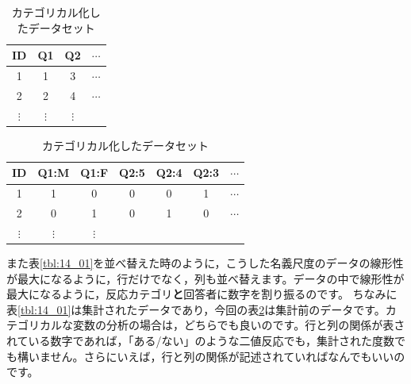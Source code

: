 \documentclass{ltjsbook}
\begin{document}
\begin{table}[ht]
	\begin{minipage}[t]{.30\textwidth}
		\begin{center}
			\caption{一般的なデータセット}
			\begin{tabular}{cccc}
				ID       & Q1       & Q2       & $\cdots$ \\\hline
				1        & 1        & 3        & $\cdots$ \\
				2        & 2        & 4        & $\cdots$ \\
				$\vdots$ & $\vdots$ & $\vdots$ &          \\\hline
			\end{tabular}
		\end{center}
		\label{tbl:14_04}
	\end{minipage}
	\hfill
	\begin{minipage}[t]{.60\textwidth}
		\begin{center}
			\caption{カテゴリカル化したデータセット}
			\begin{tabular}{ccccccc}
				ID       & Q1:M      & Q1:F     & Q2:5 & Q2:4 & Q2:3 & $\cdots$ \\\hline
				1        & 1         & 0        & 0    & 0    & 1    & $\cdots$ \\
				2        & 0         & 1        & 0    & 1    & 0    & $\cdots$ \\
				$\vdots$ & $\vdots $ & $\vdots$ &                               \\\hline
			\end{tabular}
		\end{center}
		\label{tbl:14_05}
	\end{minipage}
\end{table}

また表\ref{tbl:14_01}を並べ替えた時のように，こうした名義尺度のデータの線形性が最大になるように，行だけでなく，列も並べ替えます。データの中で線形性が最大になるように，反応カテゴリ\textbf{と}回答者に数字を割り振るのです。
ちなみに表\ref{tbl:14_01}は集計されたデータであり，今回の表\ref{tbl:14_05}は集計前のデータです。カテゴリカルな変数の分析の場合は，どちらでも良いのです。行と列の関係が表されている数字であれば，「ある/ない」のような二値反応でも，集計された度数でも構いません。さらにいえば，行と列の関係が記述されていればなんでもいいのです。
\end{document}
